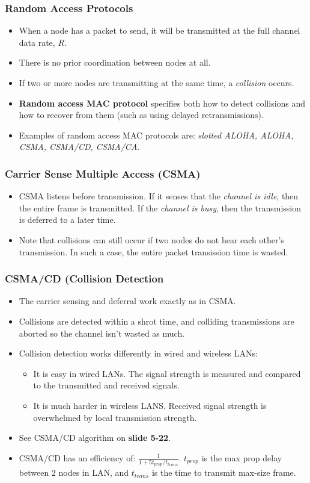 \documentclass{article}
\begin{document}
\subsubsection{Random Access Protocols}
\begin{itemize}
\item When a node has a packet to send, it will be transmitted at the full channel data rate, $R$.
\item There is no prior coordination between nodes at all.
\item If two or more nodes are transmitting at the same time, a \emph{collision} occurs.
\item {\bf Random access MAC protocol} specifies both how to detect collisions and how to recover from them (such as using delayed retransmissions).
\item Examples of random access MAC protocols are: \emph{slotted ALOHA, ALOHA, CSMA, CSMA/CD, CSMA/CA}.
\end{itemize}

\subsubsection{Carrier Sense Multiple Access (CSMA)}
\begin{itemize}
\item CSMA listens before transmission. If it senses that the \emph{channel is idle}, then the entire frame is transmitted. If the \emph{channel is busy}, then the transmission is deferred to a later time.
\item Note that collisions can still occur if two nodes do not hear each other's transmission. In such a case, the entire packet transission time is wasted.
\end{itemize}

\subsubsection{CSMA/CD (Collision Detection}
\begin{itemize}
\item The carrier sensing and deferral work exactly as in CSMA.
\item Collisions are detected within a shrot time, and colliding transmissions are aborted so the channel isn't wasted as much.
\item Collision detection works differently in wired and wireless LANs:
\begin{itemize}
\item It is easy in wired LANs. The signal strength is measured and compared to the transmitted and received signals.
\item It is much harder in wireless LANS. Received signal strength is overwhelmed by local transmission strength.
\end{itemize}
\item See CSMA/CD algorithm on {\bf slide 5-22}.
\item CSMA/CD has an efficiency of: $\frac{1}{1+5t_{prop}/t_{trans}}$. $t_{prop}$ is the max prop delay between 2 nodes in LAN, and $t_{trans}$ is the time to transmit max-size frame.
\end{itemize}
\end{document}

